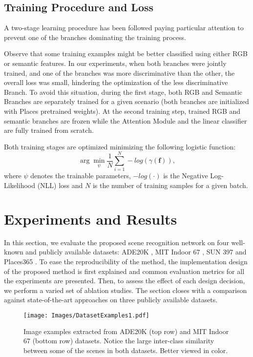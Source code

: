 \documentclass[review, 3p, sort&compress]{elsarticle}
\begin{document}
\subsection{Training Procedure and Loss} \label{subsec:Training Procedure and Loss}
A two-stage learning procedure has been followed paying particular attention to prevent one of the branches dominating the training process.

Observe that some training examples might be better classified using either RGB or semantic features. In our experiments, when both branches were jointly trained, and one of the branches was more discriminative than the other, the overall loss was small, hindering the optimization of the less discriminative Branch. To avoid this situation, during the first stage, both RGB and Semantic Branches are separately trained for a given scenario (both branches are initialized with Places pretrained weights). At the second training step, trained RGB and semantic branches are frozen while the Attention Module and the linear classifier are fully trained from scratch.

Both training stages are optimized minimizing the following logistic function:
\begin{equation}
    \label{eq:optimization}
       \arg\min_{\psi} \frac{1}{N} \sum^{N}_{i=1} -log(\gamma(\textbf{f})),
\end{equation}
where \(\psi\) denotes the trainable parameters, \(-log(\cdot)\) is the Negative Log-Likelihood (NLL) loss and \(N\) is the number of training samples for a given batch.

\section{Experiments and Results}\label{sec:Experiments and Results}
In this section, we evaluate the proposed scene recognition network on four well-known and publicly available datasets: ADE20K \cite{zhou2017scene}, MIT Indoor 67 \cite{quattoni2009recognizing}, SUN 397 \cite{xiao2010sun} and Places365 \cite{zhou2018places}. To ease the reproducibility of the method, the implementation design of the proposed method is first explained and common evaluation metrics for all the experiments are presented. Then, to assess the effect of each design decision, we perform a varied set of ablation studies. The section closes with a comparison against state-of-the-art approaches on three publicly available datasets.

\begin{figure*}[t!]
    \centering
    \texttt{[image: Images/DatasetExamples1.pdf]}
    \caption{Image examples extracted from ADE20K \cite{zhou2017scene} (top row) and MIT Indoor 67 \cite{quattoni2009recognizing} (bottom row) datasets. Notice the large inter-class similarity between some of the scenes in both datasets. Better viewed in color.}
    \label{fig:DatasetExamples1}
\end{figure*}
\end{document}
